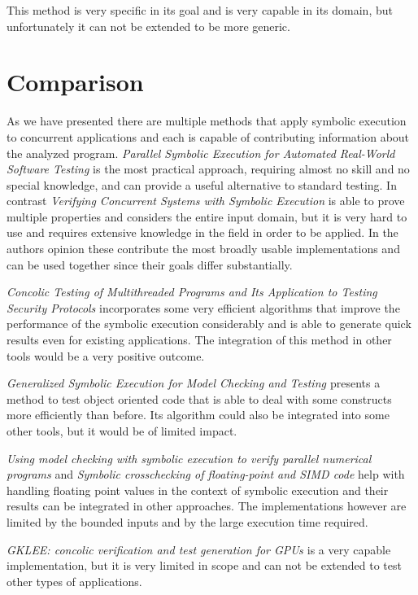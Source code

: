 \documentclass[10pt]{llncs}
\begin{document}
This method is very specific in its goal and is very capable in its domain, but unfortunately it can not be extended to be more generic.

\section{Comparison}
\label{comparison}

As we have presented there are multiple methods that apply symbolic execution to concurrent applications and each is capable of contributing information about the analyzed program. \emph{Parallel Symbolic Execution for Automated Real-World Software Testing} \cite{base3} is the most practical approach, requiring almost no skill and no special knowledge, and can provide a useful alternative to standard testing. In contrast \emph{Verifying Concurrent Systems with Symbolic Execution} \cite{base2} is able to prove multiple properties and considers the entire input domain, but it is very hard to use and requires extensive knowledge in the field in order to be applied. In the authors opinion these contribute the most broadly usable implementations and can be used together since their goals differ substantially.

\emph{Concolic Testing of Multithreaded Programs and Its Application to Testing Security Protocols} \cite{base4} incorporates some very efficient algorithms that improve the performance of the symbolic execution considerably and is able to generate quick results even for existing applications. The integration of this method in other tools would be a very positive outcome.

\emph{Generalized Symbolic Execution for Model Checking and Testing \cite{base5}} presents a method to test object oriented code that is able to deal with some constructs more efficiently than before. Its algorithm could also be integrated into some other tools, but it would be of limited impact.

\emph{Using model checking with symbolic execution to verify parallel numerical programs} \cite{base1} and \emph{Symbolic crosschecking of floating-point and SIMD code} \cite{base6} help with handling floating point values in the context of symbolic execution and their results can be integrated in other approaches. The implementations however are limited by the bounded inputs and by the large execution time required.

\emph{GKLEE: concolic verification and test generation for GPUs \cite{base7}} is a very capable implementation, but it is very limited in scope and can not be extended to test other types of applications.
\end{document}
